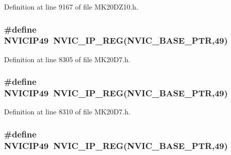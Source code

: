 Definition at line 9167 of file M\+K20\+D\+Z10.\+h.

\subsubsection[{\texorpdfstring{N\+V\+I\+C\+I\+P49}{NVICIP49}}]{\setlength{\rightskip}{0pt plus 5cm}\#define N\+V\+I\+C\+I\+P49~{\bf N\+V\+I\+C\+\_\+\+I\+P\+\_\+\+R\+EG}({\bf N\+V\+I\+C\+\_\+\+B\+A\+S\+E\+\_\+\+P\+TR},49)}\hypertarget{group___n_v_i_c___register___accessor___macros_ga592eb2d22fc02a3f96feffba593454f9}{}\label{group___n_v_i_c___register___accessor___macros_ga592eb2d22fc02a3f96feffba593454f9}


Definition at line 8305 of file M\+K20\+D7.\+h.

\subsubsection[{\texorpdfstring{N\+V\+I\+C\+I\+P49}{NVICIP49}}]{\setlength{\rightskip}{0pt plus 5cm}\#define N\+V\+I\+C\+I\+P49~{\bf N\+V\+I\+C\+\_\+\+I\+P\+\_\+\+R\+EG}({\bf N\+V\+I\+C\+\_\+\+B\+A\+S\+E\+\_\+\+P\+TR},49)}\hypertarget{group___n_v_i_c___register___accessor___macros_ga592eb2d22fc02a3f96feffba593454f9}{}\label{group___n_v_i_c___register___accessor___macros_ga592eb2d22fc02a3f96feffba593454f9}


Definition at line 8310 of file M\+K20\+D7.\+h.

\subsubsection[{\texorpdfstring{N\+V\+I\+C\+I\+P49}{NVICIP49}}]{\setlength{\rightskip}{0pt plus 5cm}\#define N\+V\+I\+C\+I\+P49~{\bf N\+V\+I\+C\+\_\+\+I\+P\+\_\+\+R\+EG}({\bf N\+V\+I\+C\+\_\+\+B\+A\+S\+E\+\_\+\+P\+TR},49)}\hypertarget{group___n_v_i_c___register___accessor___macros_ga592eb2d22fc02a3f96feffba593454f9}{}\label{group___n_v_i_c___register___accessor___macros_ga592eb2d22fc02a3f96feffba593454f9}


